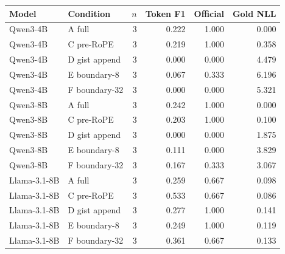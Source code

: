 \begin{tabular}{llrrrr}
\toprule
Model & Condition & $n$ & Token F1 & Official & Gold NLL \\
\midrule
Qwen3-4B & A full & 3 & 0.222 & 1.000 & 0.000 \\
Qwen3-4B & C pre-RoPE & 3 & 0.219 & 1.000 & 0.358 \\
Qwen3-4B & D gist append & 3 & 0.000 & 0.000 & 4.479 \\
Qwen3-4B & E boundary-8 & 3 & 0.067 & 0.333 & 6.196 \\
Qwen3-4B & F boundary-32 & 3 & 0.000 & 0.000 & 5.321 \\
Qwen3-8B & A full & 3 & 0.242 & 1.000 & 0.000 \\
Qwen3-8B & C pre-RoPE & 3 & 0.203 & 1.000 & 0.100 \\
Qwen3-8B & D gist append & 3 & 0.000 & 0.000 & 1.875 \\
Qwen3-8B & E boundary-8 & 3 & 0.111 & 0.000 & 3.829 \\
Qwen3-8B & F boundary-32 & 3 & 0.167 & 0.333 & 3.067 \\
Llama-3.1-8B & A full & 3 & 0.259 & 0.667 & 0.098 \\
Llama-3.1-8B & C pre-RoPE & 3 & 0.533 & 0.667 & 0.086 \\
Llama-3.1-8B & D gist append & 3 & 0.277 & 1.000 & 0.141 \\
Llama-3.1-8B & E boundary-8 & 3 & 0.249 & 1.000 & 0.119 \\
Llama-3.1-8B & F boundary-32 & 3 & 0.361 & 0.667 & 0.133 \\
\bottomrule
\end{tabular}
